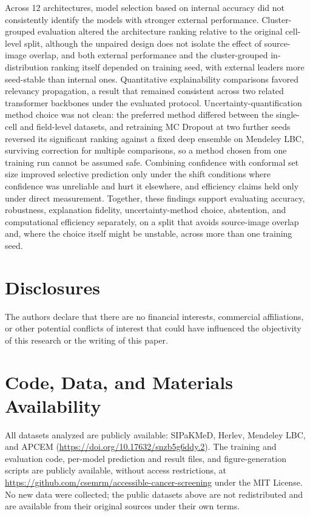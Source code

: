 \documentclass[12pt,letterpaper]{article}
\begin{document}
Across 12 architectures, model selection based on internal accuracy did not consistently identify the models with stronger external performance. Cluster-grouped evaluation altered the architecture ranking relative to the original cell-level split, although the unpaired design does not isolate the effect of source-image overlap, and both external performance and the cluster-grouped in-distribution ranking itself depended on training seed, with external leaders more seed-stable than internal ones. Quantitative explainability comparisons favored relevancy propagation, a result that remained consistent across two related transformer backbones under the evaluated protocol. Uncertainty-quantification method choice was not clean: the preferred method differed between the single-cell and field-level datasets, and retraining MC Dropout at two further seeds reversed its significant ranking against a fixed deep ensemble on Mendeley LBC, surviving correction for multiple comparisons, so a method chosen from one training run cannot be assumed safe. Combining confidence with conformal set size improved selective prediction only under the shift conditions where confidence was unreliable and hurt it elsewhere, and efficiency claims held only under direct measurement. Together, these findings support evaluating accuracy, robustness, explanation fidelity, uncertainty-method choice, abstention, and computational efficiency separately, on a split that avoids source-image overlap and, where the choice itself might be unstable, across more than one training seed.

\section*{Disclosures}
The authors declare that there are no financial interests, commercial affiliations, or other potential conflicts of interest that could have influenced the objectivity of this research or the writing of this paper.

\section*{Code, Data, and Materials Availability}
All datasets analyzed are publicly available: SIPaKMeD,\cite{plissiti2018sipakmed} Herlev,\cite{jantzen2005herlev} Mendeley LBC,\cite{hussain2020mendeley} and APCEM (\url{https://doi.org/10.17632/snzb5g6ddy.2}).\cite{aswini2026apcem} The training and evaluation code, per-model prediction and result files, and figure-generation scripts are publicly available, without access restrictions, at \url{https://github.com/csemrm/accessible-cancer-screening} under the MIT License. No new data were collected; the public datasets above are not redistributed and are available from their original sources under their own terms.
\end{document}
